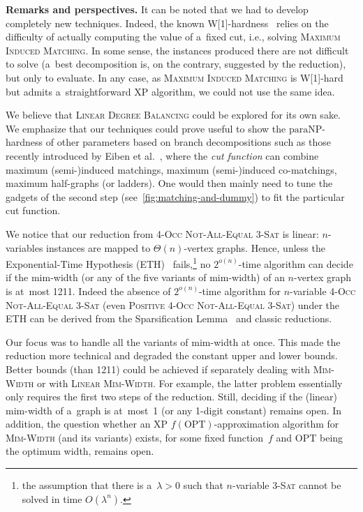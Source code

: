 \documentclass[a4paper,UKenglish,cleveref,hyperref,autoref]{lipics-v2021}
\newcommand{\paraNP}{\ensuremath{\mathrm{paraNP}}}
\begin{document}
\medskip

\textbf{Remarks and perspectives.}
It can be noted that we had to develop completely new techniques.
Indeed, the known W[1]-hardness~\cite{SaetherV15,SaetherV16} relies on the difficulty of actually computing the value of a~fixed cut, i.e., solving \textsc{Maximum Induced Matching}.
In some sense, the instances produced there are not difficult to solve (a~best decomposition is, on the contrary, suggested by the reduction), but only to evaluate.
In any case, as \textsc{Maximum Induced Matching} is W[1]-hard but admits a~straightforward XP algorithm, we could not use the same idea.

We believe that \textsc{Linear Degree Balancing} could be explored for its own sake.
We emphasize that our techniques could prove useful to show the \paraNP-hardness of other parameters based on branch decompositions such as those recently introduced by Eiben et al.~\cite{Eiben22}, where the \emph{cut function} can combine maximum (semi-)induced matchings, maximum (semi-)induced co-matchings, maximum half-graphs (or ladders).
One would then mainly need to tune the gadgets of the second step (see~\cref{fig:matching-and-dummy}) to fit the particular cut function.

We notice that our reduction from \textsc{4-Occ Not-All-Equal 3-Sat} is linear: $n$-variables instances are mapped to $\Theta(n)$-vertex graphs.
Hence, unless the Exponential-Time Hypothesis (ETH)~\cite{Impagliazzo01} fails,\footnote{the assumption that there is a~$\lambda>0$ such that $n$-variable \textsc{3-Sat} cannot be solved in time $O(\lambda^n)$.} no $2^{o(n)}$-time algorithm can decide if the mim-width (or any of the five variants of mim-width) of an $n$-vertex graph is at~most 1211.
Indeed the absence of $2^{o(n)}$-time algorithm for $n$-variable \textsc{4-Occ Not-All-Equal 3-Sat} (even \textsc{Positive 4-Occ Not-All-Equal 3-Sat}) under the ETH can be derived from the Sparsification Lemma~\cite{sparsification} and classic reductions.

Our focus was to handle all the variants of mim-width at once.
This made the reduction more technical and degraded the constant upper and lower bounds.
Better bounds (than 1211) could be achieved if separately dealing with \textsc{Mim-Width} or with \textsc{Linear Mim-Width}.
For example, the latter problem essentially only requires the first two steps of the reduction.
Still, deciding if the (linear) mim-width of a~graph is at~most~1 (or any 1-digit constant) remains open.
In addition, the question whether an XP $f(\text{OPT})$-approximation algorithm for \textsc{Mim-Width} (and its variants) exists, for some fixed function~$f$ and $\text{OPT}$ being the optimum width, remains open. 
\end{document}
